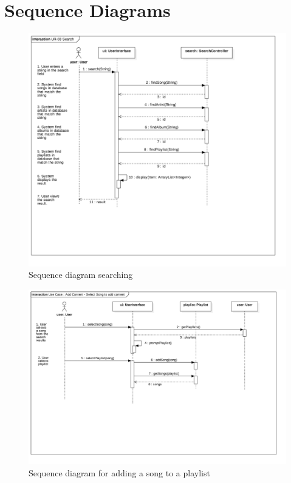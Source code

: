 \documentclass[12pt]{article}
\begin{document}
	\section{Sequence Diagrams}
	\begin{figure}[H]
		\centering
		\includegraphics[scale=0.35]{UR-03Search.png}
		\caption{Sequence diagram searching}
		\label{fig:sequenceSearcj}
	\end{figure}
	\begin{figure}[H]
		\centering
		\includegraphics[scale=0.35]{UseCaseAddSong.png}
		\caption{Sequence diagram for adding a song to a playlist}
		\label{fig:sequenceSong}
	\end{figure}
\end{document}
